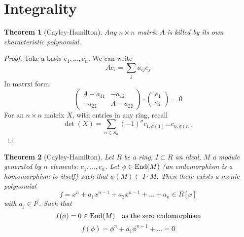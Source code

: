 \documentclass[12pt]{article}
\newcommand{\ita}[1]{\textit{#1}}
\newcommand{\en}[1]{\textup{End}(#1)}
\newcommand\en{\ita{n }}
\newtheorem{theorem}{Theorem}
\theoremstyle{definition}
\begin{document}
\section*{Integrality}
\begin{theorem}[Cayley-Hamilton]
Any $n\times n$ matrix $A$ is killed by its own characteristic polynomial.
\end{theorem}
\begin{proof}
Take a basis $e_1,\dots ,e_n$. We can write
\[
Ae_i = \sum_j a_{ij} e_j
\]
In matrxi form:
\[
\begin{pmatrix}
A-a_{11} & -a_{12}\\
-a_{22} & A-a_{22}
\end{pmatrix}
\cdot
\begin{pmatrix}
e_1\\
e_2
\end{pmatrix}
= 0
\]
For an $n\times n$ matrix $X$, with entries in any ring, recall
\[
\det(X) = \sum_{\sigma \in S_n} (-1)^\sigma c_{1,\sigma(1)} \dots c_{n,\sigma(n)}
\]

\end{proof}
\begin{theorem}[Cayley-Hamilton]
Let $R$ be a ring, $I\subset R$ an ideal, $M$ a module generated by $n$ elements: $e_1,\dots ,e_n$. Let $\phi \in \en{M}$ (an endomorphism is a homomorphism to itself) such that $\phi(M) \subset I \cdot M$. Then there exists a monic polynomial 
\[
f = x^n+a_1x^{n-1} + a_2x^{n-1}+\dots +a_n \in R[x]
\]
with $a_j \in I^j$. Such that
\[
f(\phi) = 0 \in \en{M} \quad \text{as the zero endomorphism}
\]
\[
f(\phi) = \phi^n +a_1\phi^{n-1}+\dots = 0
\]
\end{theorem}
\end{document}
